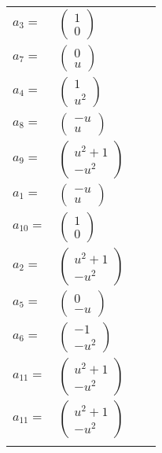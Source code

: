 \documentclass[1p]{elsarticle_modified}
\theoremstyle{definition}
\begin{document}
\begin{tabular}{m{7pt} m{180pt} m{7pt} m{180pt} }
\flushright $a_{3}=$&$\begin{pmatrix}1\\0\end{pmatrix}$ \\
\flushright $a_{7}=$&$\begin{pmatrix}0\\u\end{pmatrix}$ \\
\flushright $a_{4}=$&$\begin{pmatrix}1\\u^2\end{pmatrix}$ \\
\flushright $a_{8}=$&$\begin{pmatrix}- u\\u\end{pmatrix}$ \\
\flushright $a_{9}=$&$\begin{pmatrix}u^2+1\\- u^2\end{pmatrix}$ \\
\flushright $a_{1}=$&$\begin{pmatrix}- u\\u\end{pmatrix}$ \\
\flushright $a_{10}=$&$\begin{pmatrix}1\\0\end{pmatrix}$ \\
\flushright $a_{2}=$&$\begin{pmatrix}u^2+1\\- u^2\end{pmatrix}$ \\
\flushright $a_{5}=$&$\begin{pmatrix}0\\- u\end{pmatrix}$ \\
\flushright $a_{6}=$&$\begin{pmatrix}-1\\- u^2\end{pmatrix}$ \\
\flushright $a_{11}=$&$\begin{pmatrix}u^2+1\\- u^2\end{pmatrix}$\\ \flushright $a_{11}=$&$\begin{pmatrix}u^2+1\\- u^2\end{pmatrix}$\\&\end{tabular}
\end{document}

